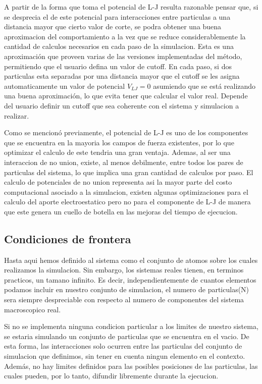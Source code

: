 \documentclass[a4paper,10pt]{report}
\begin{document}
A partir de la forma que toma el potencial de L-J resulta razonable pensar que, si se desprecia el de este potencial para interacciones entre particulas a una distancia mayor que cierto valor de corte, se podra obtener una buena aproximacion del comportamiento a la vez que se reduce considerablemente la cantidad de calculos necesarios en cada paso de la simulacion.
Esta es una aproximación que proveen varias de las versiones implementadas del método, permitiendo que el usuario defina un valor de cutoff. 
En cada paso, si dos particulas esta separadas por una distancia mayor que el cutoff se les asigna automaticamente un valor de potencial $V_{LJ}=0$ asumiendo que se está realizando una buena aproximación, lo que evita tener que calcular el valor real. 
Depende del usuario definir un cutoff que sea coherente con el sistema y simulacion a realizar.









Como se mencionó previamente, el potencial de L-J es uno de los componentes que se encuentra en la mayoria los campos de fuerza existentes, por lo que optimizar el calculo de este tendria una gran ventaja. 
Ademas, al ser una interaccion de no union, existe, al menos debilmente, entre todos los pares de particulas del sistema, lo que implica una gran cantidad de calculos por paso. El calculo de potenciales de no union representa asi la mayor parte del costo computacional asociado a la simulacion, existen algunas optimizaciones para el calculo del aporte electroestatico pero no para el componente de L-J de manera que este genera un cuello de botella en las mejoras del tiempo de ejecucion.


\subsection{Condiciones de frontera}

Hasta aqui hemos definido al sistema como el conjunto de atomos sobre los cuales realizamos la simulacion. 
Sin embargo, los sistemas reales tienen, en terminos practicos, un tamano infinito. 
Es decir, independientemente de cuantos elementos podamos incluir en nuestro conjunto de simulacion, el numero de particulas(N) sera siempre despreciable con respecto al numero de componentes del sistema macroscopico real.

Si no se implementa ninguna condicion particular a los limites de nuestro sistema, se estaria simulando un conjunto de particulas que se encuentra en el vacio. 
De esta forma, las interacciones solo ocurren entre las particulas del conjunto de simulacion que definimos, sin tener en cuenta ningun elemento en el contexto.
Además, no hay limites definidos para las posibles posiciones de las particulas, las cuales pueden, por lo tanto, difundir libremente durante la ejecucion.
\end{document}
